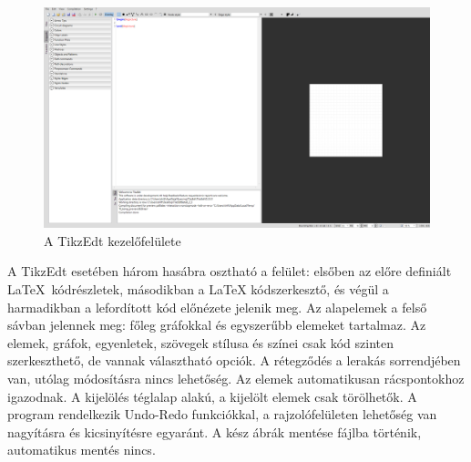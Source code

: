 \begin{figure}[!h]
	\includegraphics[width=\textwidth]{images/tikzedt.png}
	\caption{A TikzEdt kezelőfelülete \cite{tikzedt}}
\label{fig:tikzedt}
\end{figure}
A TikzEdt esetében három hasábra osztható a felület: elsőben az előre definiált \LaTeX\ kódrészletek, másodikban a LaTeX kódszerkesztő, és végül a harmadikban a lefordított kód előnézete jelenik meg. Az alapelemek a felső sávban jelennek meg: főleg gráfokkal és egyszerűbb elemeket tartalmaz. Az elemek, gráfok, egyenletek, szövegek stílusa és színei csak kód szinten szerkeszthető, de vannak választható opciók. A rétegződés a lerakás sorrendjében van, utólag módosításra nincs lehetőség. Az elemek automatikusan rácspontokhoz igazodnak. A kijelölés téglalap alakú, a kijelölt elemek csak törölhetők.  A program rendelkezik Undo-Redo funkciókkal, a rajzolófelületen lehetőség van nagyításra és kicsinyítésre egyaránt. A kész ábrák mentése fájlba történik, automatikus mentés nincs.

